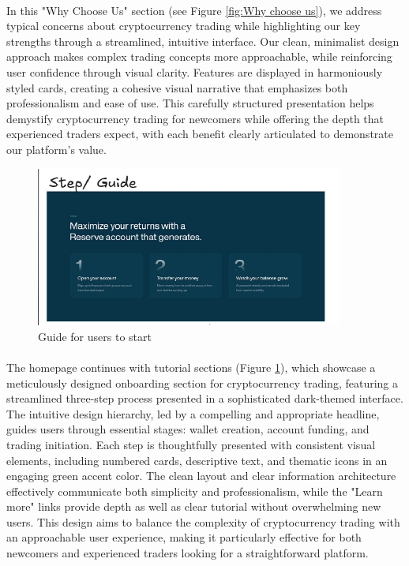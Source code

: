 \paragraph{}In this "Why Choose Us" section (see Figure \ref{fig:Why choose us}), we address typical concerns about cryptocurrency trading while highlighting our key strengths through a streamlined, intuitive interface. Our clean, minimalist design approach makes complex trading concepts more approachable, while reinforcing user confidence through visual clarity. Features are displayed in harmoniously styled cards, creating a cohesive visual narrative that emphasizes both professionalism and ease of use. This carefully structured presentation helps demystify cryptocurrency trading for newcomers while offering the depth that experienced traders expect, with each benefit clearly articulated to demonstrate our platform's value.
\begin{figure}[h]
    \centering
    \includegraphics[width= 0.9\textwidth]{root/step.png}
     \caption{Guide for users to start}
    \label{fig:step}
\end{figure}
\paragraph{}The homepage continues with tutorial sections (Figure \ref{fig:step}), which showcase a meticulously designed onboarding section for cryptocurrency trading, featuring a streamlined three-step process presented in a sophisticated dark-themed interface. The intuitive design hierarchy, led by a compelling and appropriate headline, guides users through essential stages: wallet creation, account funding, and trading initiation. Each step is thoughtfully presented with consistent visual elements, including numbered cards, descriptive text, and thematic icons in an engaging green accent color. The clean layout and clear information architecture effectively communicate both simplicity and professionalism, while the "Learn more" links provide depth as well as clear tutorial without overwhelming new users. This design aims to balance the complexity of cryptocurrency trading with an approachable user experience, making it particularly effective for both newcomers and experienced traders looking for a straightforward platform.

